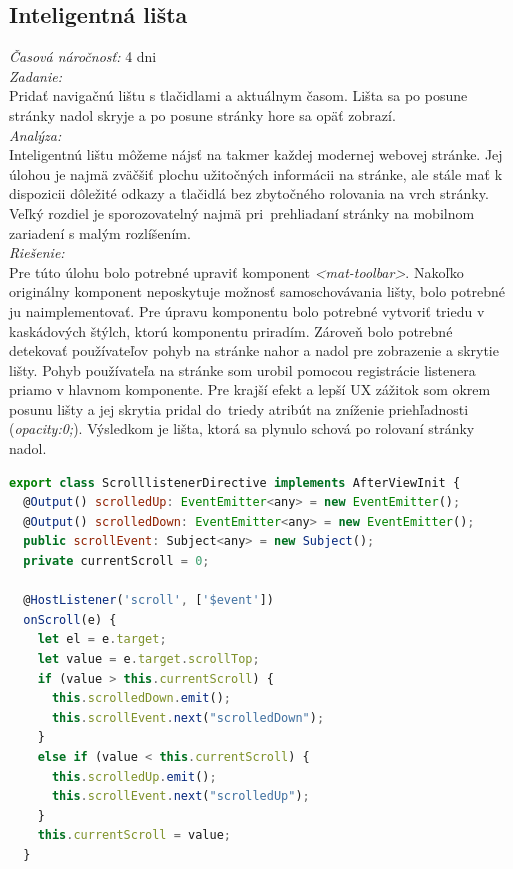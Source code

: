 \documentclass[11pt, oneside]{report}
\begin{document}
\subsection{Inteligentná lišta }
\textit{Časová náročnosť:} 4 dni\\
\textit{Zadanie:}\\
Pridať navigačnú lištu s tlačidlami a aktuálnym časom. Lišta sa po posune stránky nadol skryje a po posune stránky hore sa opäť zobrazí.
\\\textit{Analýza:}\\
Inteligentnú lištu môžeme nájsť na takmer každej modernej webovej stránke. Jej úlohou je najmä zväčšiť plochu užitočných informácii na stránke, ale stále mať k dispozicii dôležité odkazy a tlačidlá  bez  zbytočného rolovania na vrch stránky. Veľký rozdiel je sporozovatelný najmä pri~prehliadaní stránky na mobilnom zariadení s malým rozlíšením. 
\\\textit{Riešenie:}\\
Pre túto úlohu bolo potrebné upraviť komponent \textit{<mat-toolbar>}. Nakoľko originálny komponent neposkytuje možnosť samoschovávania lišty, bolo potrebné ju naimplementovať. Pre úpravu komponentu bolo potrebné vytvoriť triedu v kaskádových štýlch, ktorú komponentu priradím. Zároveň bolo potrebné detekovať používateľov pohyb na stránke nahor a nadol pre zobrazenie a skrytie lišty. Pohyb  používateľa na stránke som urobil pomocou registrácie listenera priamo v hlavnom komponente.  Pre krajší efekt a lepší UX  zážitok  som okrem posunu lišty a jej skrytia pridal do~triedy  atribút na zníženie priehľadnosti (\textit{opacity:0;}). Výsledkom je  lišta, ktorá sa plynulo schová po rolovaní stránky nadol. 

\begin{lstlisting}[language=Javascript,showstringspaces=false, caption= Funkcia na odchytávanie rolovania stránky,captionpos=b]
export class ScrolllistenerDirective implements AfterViewInit {
  @Output() scrolledUp: EventEmitter<any> = new EventEmitter();
  @Output() scrolledDown: EventEmitter<any> = new EventEmitter();
  public scrollEvent: Subject<any> = new Subject();
  private currentScroll = 0;

  @HostListener('scroll', ['$event'])
  onScroll(e) {
    let el = e.target;
    let value = e.target.scrollTop;
    if (value > this.currentScroll) {
      this.scrolledDown.emit();
      this.scrollEvent.next("scrolledDown");
    }
    else if (value < this.currentScroll) {
      this.scrolledUp.emit();
      this.scrollEvent.next("scrolledUp");
    }
    this.currentScroll = value;
  }
\end{lstlisting}
\end{document}
